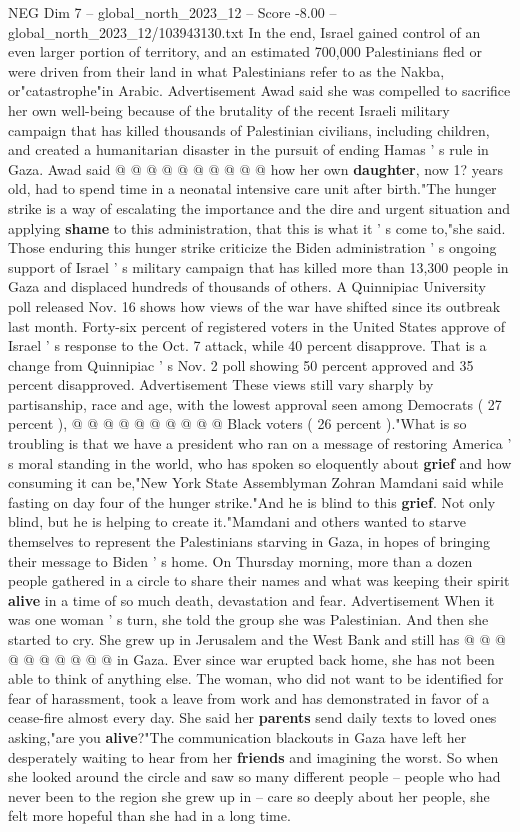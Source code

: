 \begin{textsample}{NEG Dim 7 – global\_north\_2023\_12 – Score -8.00 – global\_north\_2023\_12/103943130.txt}
In the end, Israel gained control of an even larger portion of territory, and an estimated 700,000 Palestinians fled or were driven from their land in what Palestinians refer to as the Nakba, or"catastrophe"in Arabic.
Advertisement Awad said she was compelled to sacrifice her own well-being because of the brutality of the recent Israeli military campaign that has killed thousands of Palestinian civilians, including children, and created a humanitarian disaster in the pursuit of ending Hamas ' s rule in Gaza.
Awad said @ @ @ @ @ @ @ @ @ @ how her own \textbf{daughter}, now 1? years old, had to spend time in a neonatal intensive care unit after birth."The hunger strike is a way of escalating the importance and the dire and urgent situation and applying \textbf{shame} to this administration, that this is what it ' s come to,"she said.
Those enduring this hunger strike criticize the Biden administration ' s ongoing support of Israel ' s military campaign that has killed more than 13,300 people in Gaza and displaced hundreds of thousands of others.
A Quinnipiac University poll released Nov. 16 shows how views of the war have shifted since its outbreak last month.
Forty-six percent of registered voters in the United States approve of Israel ' s response to the Oct. 7 attack, while 40 percent disapprove.
That is a change from Quinnipiac ' s Nov. 2 poll showing 50 percent approved and 35 percent disapproved.
Advertisement These views still vary sharply by partisanship, race and age, with the lowest approval seen among Democrats ( 27 percent ), @ @ @ @ @ @ @ @ @ @ Black voters ( 26 percent )."What is so troubling is that we have a president who ran on a message of restoring America ' s moral standing in the world, who has spoken so eloquently about \textbf{grief} and how consuming it can be,"New York State Assemblyman Zohran Mamdani said while fasting on day four of the hunger strike."And he is blind to this \textbf{grief}.
Not only blind, but he is helping to create it."Mamdani and others wanted to starve themselves to represent the Palestinians starving in Gaza, in hopes of bringing their message to Biden ' s home.
On Thursday morning, more than a dozen people gathered in a circle to share their names and what was keeping their spirit \textbf{alive} in a time of so much death, devastation and fear.
Advertisement When it was one woman ' s turn, she told the group she was Palestinian.
And then she started to cry.
She grew up in Jerusalem and the West Bank and still has @ @ @ @ @ @ @ @ @ @ in Gaza.
Ever since war erupted back home, she has not been able to think of anything else.
The woman, who did not want to be identified for fear of harassment, took a leave from work and has demonstrated in favor of a cease-fire almost every day.
She said her \textbf{parents} send daily texts to loved ones asking,"are you \textbf{alive}?"The communication blackouts in Gaza have left her desperately waiting to hear from her \textbf{friends} and imagining the worst.
So when she looked around the circle and saw so many different people -- people who had never been to the region she grew up in -- care so deeply about her people, she felt more hopeful than she had in a long time.


\end{textsample}
